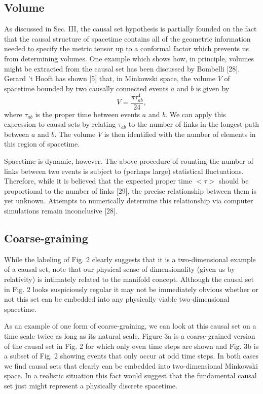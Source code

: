\subsection{Volume}

As discussed in Sec. III, the causal set hypothesis is partially founded on
the fact that the causal structure of spacetime contains all of the
geometric information needed to specify the metric tensor up to a conformal
factor which prevents us from determining volumes. One example which shows
how, in principle, volumes might be extracted from the causal set has been
discussed by Bombelli [28]. Gerard 't Hooft has shown [5] that, in Minkowski
space, the volume $V$ of spacetime bounded by two causally connected events $%
a$ and $b$ is given by 
\begin{equation}
V=\frac{\pi \tau _{ab}^4}{24},  \label{4}
\end{equation}
where $\tau _{ab}$ is the proper time between events $a$ and $b$. We can
apply this expression to causal sets by relating $\tau _{ab}$ to the number
of links in the longest path between $a$ and $b$. The volume $V$ is then
identified with the number of elements in this region of spacetime.

Spacetime is dynamic, however. The above procedure of counting the number of
links between two events is subject to (perhaps large) statistical
fluctuations. Therefore, while it is believed that the expected proper time $%
<\tau >$ should be proportional to the number of links [29], the precise
relationship between them is yet unknown. Attempts to numerically determine
this relationship via computer simulations remain inconclusive [28].

\subsection{Coarse-graining}

While the labeling of Fig. 2 clearly suggests that it is a two-dimensional
example of a causal set, note that our physical sense of dimensionality
(given us by relativity) is intimately related to the manifold concept.
Although the causal set in Fig. 2 looks suspiciously regular it may not be
immediately obvious whether or not this set can be embedded into any
physically viable two-dimensional spacetime.

As an example of one form of coarse-graining, we can look at this causal set
on a time scale twice as long as its natural scale. Figure 3a is a
coarse-grained version of the causal set in Fig. 2 for which only even time
steps are shown and Fig. 3b is a subset of Fig. 2 showing events that only
occur at odd time steps. In both cases we find causal sets that clearly can
be embedded into two-dimensional Minkowski space. In a realistic situation
this fact would suggest that the fundamental causal set just might represent
a physically discrete spacetime.

